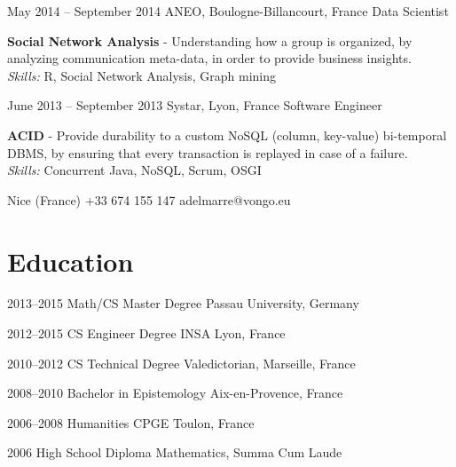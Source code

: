 \documentclass{tccv}
\renewcommand{\it}{\textit}
\renewcommand{\bf}{\textbf}
\begin{document}
\begin{eventlist}
\item{May 2014 -- September 2014}
    {ANEO, Boulogne-Billancourt, France}
    {Data Scientist}

\bf{Social Network Analysis} - Understanding how a group is organized, by analyzing communication meta-data, in order to provide business insights.\\
\it{Skills:} R, Social Network Analysis, Graph mining

\item{June 2013 -- September 2013}
    {Systar, Lyon, France}
    {Software Engineer}

\bf{ACID} - Provide durability to a custom NoSQL (column, key-value) bi-temporal DBMS, by ensuring that every transaction is replayed in case of a failure.\\
\it{Skills:} Concurrent Java, NoSQL, Scrum, OSGI



\end{eventlist}

\personal
    {Nice (France)}
    {+33 674 155 147}
    {adelmarre@vongo.eu}

\section{Education}

\begin{yearlist}

\item{2013--2015}
     {Math/CS Master Degree}
     {Passau University, Germany}

\item{2012--2015}
     {CS Engineer Degree}
     {INSA Lyon, France}

\item{2010--2012}
     {CS Technical Degree}
     {Valedictorian, Marseille, France}

\item{2008--2010}
     {Bachelor in Epistemology}
     {Aix-en-Provence, France}

\item{2006--2008}
     {Humanities CPGE}
     {Toulon, France}

\item{2006}
     {High School Diploma}
     {Mathematics, Summa Cum Laude}

\end{yearlist}
\end{document}
